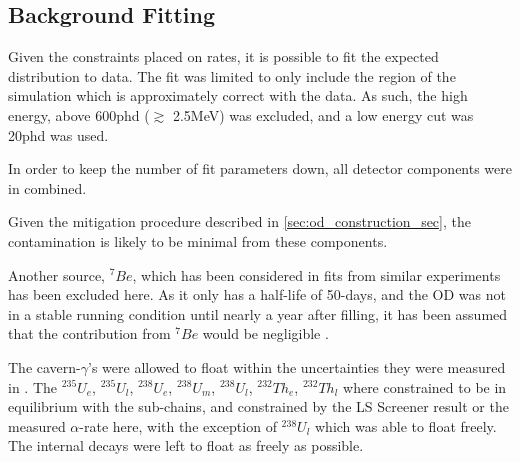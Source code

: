 \subsection{Background Fitting}
\par
Given the constraints placed on rates, it is possible to fit the expected distribution to data. 
The fit was limited to only include the region of the simulation which is approximately correct with the data. 
As such, the high energy, above 600phd ($\gtrsim$ 2.5MeV) was excluded, and a low energy cut was 20phd was used.
\par
In order to keep the number of fit parameters down, all detector components were in combined. 

Given the mitigation procedure described in \autoref{sec:od_construction_sec}, the contamination is likely to be minimal from these components.
\par
Another source, ${}^{7}Be$, which has been considered in fits from similar experiments has been excluded here.
As it only has a half-life of 50-days, and the OD was not in a stable running condition until nearly a year after filling, it has been assumed that the contribution from ${}^{7}Be$ would be negligible \cite{be7_decay_ref}.
\par
The cavern-$\gamma$'s were allowed to float within the uncertainties they were measured in \cite{LZ_Gamma_Ray_Background_ref}.
The ${}^{235}U_e$, ${}^{235}U_l$, ${}^{238}U_e$, ${}^{238}U_m$, ${}^{238}U_l$, ${}^{232}Th_e$, ${}^{232}Th_l$ where constrained to be in equilibrium with the sub-chains, and constrained by the LS Screener result or the measured $\alpha$-rate here, with the exception of ${}^{238}U_l$ which was able to float freely.
The internal decays were left to float as freely as possible.




